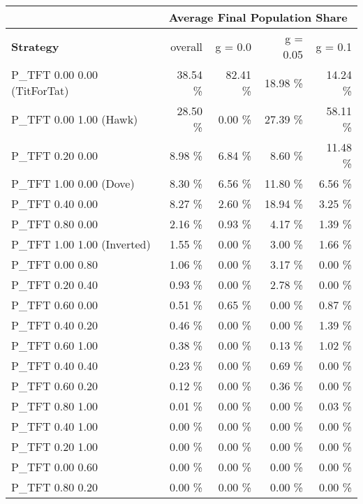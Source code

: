 \begin{tabular}{|l|r|r|r|r|}
\hline
 & \multicolumn{4}{c|}{{\bf Average Final Population Share}} \\
\hline
{\bf Strategy} & overall &  g = 0.0 & g = 0.05 & g = 0.1\\ \hline
P\_TFT 0.00 0.00 (TitForTat)  &   38.54 \%  &   82.41 \%  &   18.98 \%  &   14.24 \% \\
P\_TFT 0.00 1.00 (Hawk)       &   28.50 \%  &    0.00 \%  &   27.39 \%  &   58.11 \% \\
P\_TFT 0.20 0.00              &    8.98 \%  &    6.84 \%  &    8.60 \%  &   11.48 \% \\
P\_TFT 1.00 0.00 (Dove)       &    8.30 \%  &    6.56 \%  &   11.80 \%  &    6.56 \% \\
P\_TFT 0.40 0.00              &    8.27 \%  &    2.60 \%  &   18.94 \%  &    3.25 \% \\
P\_TFT 0.80 0.00              &    2.16 \%  &    0.93 \%  &    4.17 \%  &    1.39 \% \\
P\_TFT 1.00 1.00 (Inverted)   &    1.55 \%  &    0.00 \%  &    3.00 \%  &    1.66 \% \\
P\_TFT 0.00 0.80              &    1.06 \%  &    0.00 \%  &    3.17 \%  &    0.00 \% \\
P\_TFT 0.20 0.40              &    0.93 \%  &    0.00 \%  &    2.78 \%  &    0.00 \% \\
P\_TFT 0.60 0.00              &    0.51 \%  &    0.65 \%  &    0.00 \%  &    0.87 \% \\
P\_TFT 0.40 0.20              &    0.46 \%  &    0.00 \%  &    0.00 \%  &    1.39 \% \\
P\_TFT 0.60 1.00              &    0.38 \%  &    0.00 \%  &    0.13 \%  &    1.02 \% \\
P\_TFT 0.40 0.40              &    0.23 \%  &    0.00 \%  &    0.69 \%  &    0.00 \% \\
P\_TFT 0.60 0.20              &    0.12 \%  &    0.00 \%  &    0.36 \%  &    0.00 \% \\
P\_TFT 0.80 1.00              &    0.01 \%  &    0.00 \%  &    0.00 \%  &    0.03 \% \\
P\_TFT 0.40 1.00              &    0.00 \%  &    0.00 \%  &    0.00 \%  &    0.00 \% \\
P\_TFT 0.20 1.00              &    0.00 \%  &    0.00 \%  &    0.00 \%  &    0.00 \% \\
P\_TFT 0.00 0.60              &    0.00 \%  &    0.00 \%  &    0.00 \%  &    0.00 \% \\
P\_TFT 0.80 0.20              &    0.00 \%  &    0.00 \%  &    0.00 \%  &    0.00 \% \\

\end{tabular}
